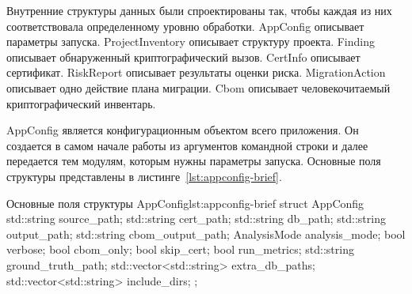 \documentclass{itmo-vkr}
\begin{document}
	Внутренние структуры данных были спроектированы так, чтобы каждая из них соответствовала определенному уровню обработки. AppConfig описывает параметры запуска. ProjectInventory описывает структуру проекта. Finding описывает обнаруженный криптографический вызов. CertInfo описывает сертификат. RiskReport описывает результаты оценки риска. MigrationAction описывает одно действие плана миграции. Cbom описывает человекочитаемый криптографический инвентарь.
	
	AppConfig является конфигурационным объектом всего приложения. Он создается в самом начале работы из аргументов командной строки и далее передается тем модулям, которым нужны параметры запуска. Основные поля структуры представлены в листинге~\ref{lst:appconfig-brief}.
	
\begin{itmolistingfloat}[C++]{Основные поля структуры AppConfig}{lst:appconfig-brief}
struct AppConfig {
    std::string source_path;
    std::string cert_path;
    std::string db_path;
    std::string output_path;
    std::string cbom_output_path;
    AnalysisMode analysis_mode;
    bool verbose;
    bool cbom_only;
    bool skip_cert;
    bool run_metrics;
    std::string ground_truth_path;
    std::vector<std::string> extra_db_paths;
    std::vector<std::string> include_dirs;
};
\end{itmolistingfloat}
\end{document}
